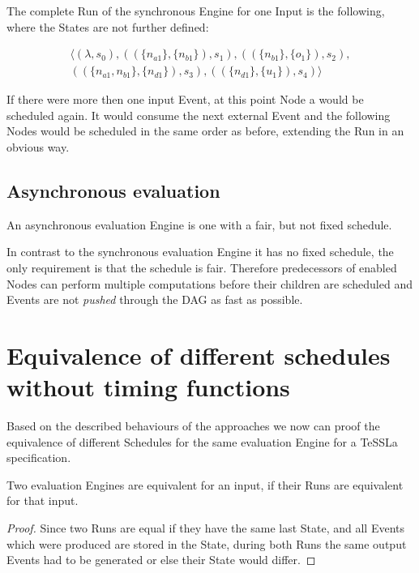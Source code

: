 The complete Run of the synchronous Engine for one Input is the following, where the States are not further defined:

\begin{align*}
  \langle
    (\lambda,                             s_0),
    ((\{ n_{a1}         \}, \{n_{b1}\}),  s_1),
    ((\{ n_{b1}         \}, \{o_1\}),     s_2),\\
    ((\{ n_{a1}, n_{b1} \}, \{n_{d1}\}),  s_3),
    ((\{ n_{d1}         \}, \{u_1\}),     s_4)
  \rangle
\end{align*}

If there were more then one input Event, at this point Node a would be scheduled again.
It would consume the next external Event and the following Nodes would be scheduled in the same order as before, extending the Run in an obvious way.

\subsection{Asynchronous evaluation}
\label{sec:concepts:behaviour_without_timing:async}

An asynchronous evaluation Engine is one with a fair, but not fixed schedule.

In contrast to the synchronous evaluation Engine it has no fixed schedule, the only requirement is that the schedule is fair.
Therefore predecessors of enabled Nodes can perform multiple computations before their children are scheduled and Events are not \emph{pushed} through the DAG as fast as possible.

\section{Equivalence of different schedules without timing functions}
\label{sec:concepts:equivalence_without_timing}

Based on the described behaviours of the approaches we now can proof the equivalence of different Schedules for the same evaluation Engine for a TeSSLa specification.

\begin{lemma}[name = Equivalence of Engines for one Input]\label{lemma:eval_equivalent_if_runs_equal}
  Two evaluation Engines are equivalent for an input, if their Runs are equivalent for that input.
\end{lemma}

\begin{proof}
  Since two Runs are equal if they have the same last State, and all Events which were produced are stored in the State, during both Runs the same output Events had to be generated or else their State would differ.
\end{proof}

